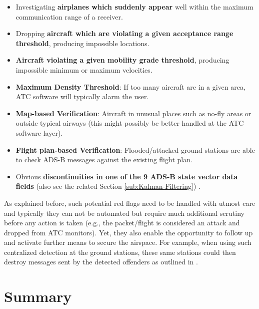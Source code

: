 \documentclass[english]{IEEEtran}
\begin{document}
\begin{itemize}
\item Investigating\textbf{ airplanes which suddenly appear} well within
the maximum communication range of a receiver.
\item Dropping \textbf{aircraft which are violating a given acceptance range
threshold}, producing impossible locations.
\item \textbf{Aircraft violating a given mobility grade threshold}, producing
impossible minimum or maximum velocities.
\item \textbf{Maximum Density Threshold}: If too many aircraft are in a
given area, ATC software will typically alarm the user.
\item \textbf{Map-based Verification}: Aircraft in unusual places such as
no-fly areas or outside typical airways (this might possibly be better
handled at the ATC software layer).
\item \textbf{Flight plan-based Verification}: Flooded/attacked ground stations
are able to check ADS-B messages against the existing flight plan.
\item Obvious \textbf{discontinuities in one of the 9 ADS-B state vector
data fields} (also see the related Section \ref{sub:Kalman-Filtering})
.
\end{itemize}
As explained before, such potential red flags need to be handled with
utmost care and typically they can not be automated but require much
additional scrutiny before any action is taken (e.g., the packet/flight
is considered an attack and dropped from ATC monitors). Yet, they
also enable the opportunity to follow up and activate further means
to secure the airspace. For example, when using such centralized detection
at the ground stations, these same stations could then destroy messages
sent by the detected offenders as outlined in \cite{Martinovic2009,Wilhelm2011}.\\



\section{Summary \label{sec:Summary}}
\end{document}
